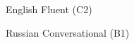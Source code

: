 
\begin{cvskills}

  \cvskill
    {English} %
    {Fluent (C2)} %

  \cvskill
    {Russian} %
    {Conversational (B1)} %


\end{cvskills}